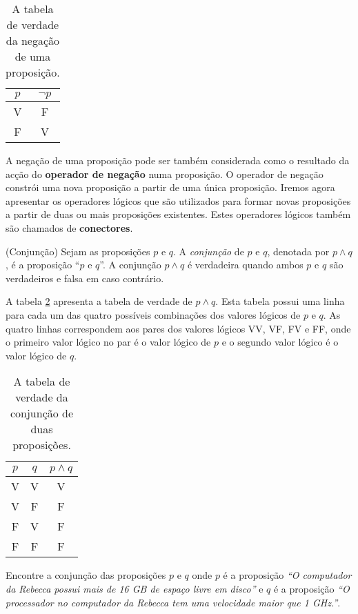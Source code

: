 \begin{table}[H]
\centering
\begin{tabular}{|c|c|}%
\toprule
\textbf{$p$} & \textbf{$\lnot p$}\\ 
\midrule
V	&	F\\
F	&	V\\
\bottomrule%
\end{tabular}%
\caption{A tabela de verdade da negação de uma proposição.}
\label{tab11}
\end{table}

A negação de uma proposição pode ser também considerada como o resultado da
acção do \textbf{operador de negação} numa proposição. O operador de negação
constrói uma nova proposição a partir de uma única proposição. Iremos agora
apresentar os operadores lógicos que são utilizados para formar novas
proposições a partir de duas ou mais proposições existentes. Estes operadores lógicos também
são chamados de \textbf{conectores}.

\label{def12}
\begin{defn}
(Conjunção) Sejam as proposições $p$ e $q$. A
	\emph{conjunção} de $p$ e $q$, denotada por $p \land q$, é a proposição ``$p$
	e $q$''. A conjunção $p \land q$ é verdadeira quando ambos $p$ e $q$ são
	verdadeiros e falsa em caso contrário.
\end{defn}

A tabela \ref{tab12} apresenta a tabela de verdade de $p \land q$. Esta
tabela possui uma linha para cada um das quatro possíveis combinações dos valores
lógicos de $p$ e $q$. As quatro linhas correspondem aos pares dos valores
lógicos VV, VF, FV e FF, onde o primeiro valor lógico no par é o valor lógico de $p$ e o
segundo valor lógico é o valor lógico de $q$.

\begin{table}[H]
\centering
\begin{tabular}{|c|c|c|}%
\toprule
\textbf{$p$} & \textbf{$q$} & \textbf{$p \land q$}\\ 
\midrule
V & V & V\\
V &	F & F\\
F &	V & F\\
F &	F & F\\
\bottomrule%
\end{tabular}%
\caption{A tabela de verdade da conjunção de duas proposições.}
\label{tab12}
\end{table}


\begin{exmp}
\label{exem14}
Encontre a conjunção das proposições $p$ e $q$ onde $p$ é a proposição \emph{``O
computador da Rebecca possui mais de 16 GB de espaço livre em disco''} e $q$ é a
proposição \emph{``O processador no computador da Rebecca tem uma velocidade maior que 1 GHz.''}.
\end{exmp}
	
